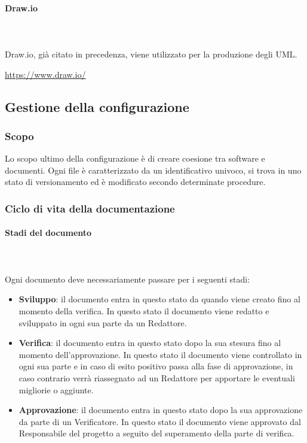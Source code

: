 		\paragraph{Draw.io} \mbox{}\\ \mbox{}\\
		Draw.io, già citato in precedenza, viene utilizzato per la produzione degli UML\glo. \newline
		\centerline{\url{https://www.draw.io/}}
		
	\subsection{Gestione della configurazione}
	\subsubsection{Scopo}
	Lo scopo ultimo della configurazione è di creare coesione tra software e documenti. Ogni file è caratterizzato da un identificativo univoco, si trova in uno stato di versionamento ed è modificato secondo determinate procedure.
	\subsubsection{Ciclo di vita della documentazione}
	\paragraph{Stadi del documento} \mbox{}\\ \mbox{}\\
	Ogni documento deve necessariamente passare per i seguenti stadi:
	\begin{itemize}
		\item \textbf{Sviluppo}: il documento entra in questo stato da quando viene creato fino al momento della verifica. In questo stato il documento viene redatto e sviluppato in ogni sua parte da un Redattore.
		\item \textbf{Verifica}: il documento entra in questo stato dopo la sua stesura fino al momento dell'approvazione. In questo stato il documento viene controllato in ogni sua parte e in caso di esito positivo passa alla fase di approvazione, in caso contrario verrà riassegnato ad un Redattore per apportare le eventuali migliorie o aggiunte.
		\item \textbf{Approvazione}: il documento entra in questo stato dopo la sua approvazione da parte di un Verificatore. In questo stato il documento viene approvato dal Responsabile del progetto a seguito del superamento della parte di verifica.
	\end{itemize}
